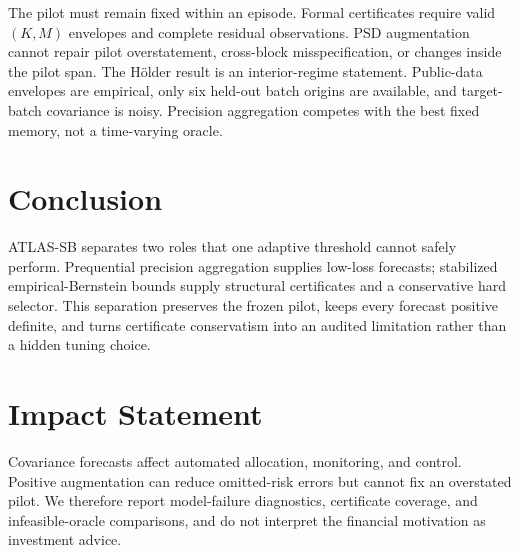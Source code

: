 \documentclass{article}
\theoremstyle{definition}
\theoremstyle{remark}
\begin{document}
The pilot must remain fixed within an episode.  Formal certificates require valid $(K,M)$ envelopes and complete residual observations.  PSD augmentation cannot repair pilot overstatement, cross-block misspecification, or changes inside the pilot span.  The H\"older result is an interior-regime statement.  Public-data envelopes are empirical, only six held-out batch origins are available, and target-batch covariance is noisy.  Precision aggregation competes with the best fixed memory, not a time-varying oracle.

\section{Conclusion}

ATLAS-SB separates two roles that one adaptive threshold cannot safely perform.  Prequential precision aggregation supplies low-loss forecasts; stabilized empirical-Bernstein bounds supply structural certificates and a conservative hard selector.  This separation preserves the frozen pilot, keeps every forecast positive definite, and turns certificate conservatism into an audited limitation rather than a hidden tuning choice.

\section*{Impact Statement}
Covariance forecasts affect automated allocation, monitoring, and control.  Positive augmentation can reduce omitted-risk errors but cannot fix an overstated pilot.  We therefore report model-failure diagnostics, certificate coverage, and infeasible-oracle comparisons, and do not interpret the financial motivation as investment advice.

\clearpage
{}



\clearpage
\appendix
{}


\end{document}
